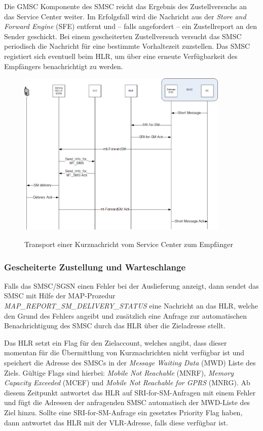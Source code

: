 \documentclass[german,12pt,a4paper]{article}
\begin{document}
Die GMSC Komponente des SMSC reicht das Ergebnis des Zustellversuchs an das Service Center weiter. Im
Erfolgsfall wird die Nachricht aus der \textit{Store and Forward Engine} (SFE) entfernt und -- falls angefordert --
ein Zustellreport an den Sender geschickt\cite{3gpp:techrel}. Bei einem gescheiterten Zustellversuch versucht das SMSC
periodisch die Nachricht für eine bestimmte Vorhaltezeit zuzstellen. Das SMSC registiert sich eventuell 
beim HLR, um über eine erneute Verfügbarkeit des Empfängers benachrichtigt zu werden.

\begin{figure}[htm]
    \centering
	\includegraphics[width=0.9\textwidth]{img/mt-forward-sm.png}
    \label{fig:mt-forward-sm}
    \caption{Transport einer Kurznachricht vom Service Center zum Empfänger}
\end{figure}	

\subsubsection{Gescheiterte Zustellung und Warteschlange}
Falls das SMSC/SGSN einen Fehler bei der Auslieferung anzeigt, dann sendet das SMSC mit Hilfe der 
MAP-Prozedur \textit{MAP\_REPORT\_SM\_DELIVERY\_STATUS} eine Nachricht an das HLR, welche den Grund des Fehlers
angeibt und zusätzlich eine Anfrage zur automatischen Benachrichtigung des SMSC durch das HLR über die 
Zieladresse stellt.

Das HLR setzt ein Flag für den Zielaccount, welches angibt, dass dieser momentan für die Übermittlung von 
Kurznachrichten nicht verfügbar ist und speichert die Adresse des SMSCs in der \textit{Message Waiting Data} (MWD) 
Liste des Ziels. Gültige Flags sind hierbei: \textit{Mobile Not Reachable} (MNRF), \textit{Memory Capacity Exceeded} (MCEF) und
\textit{Mobile Not Reachable for GPRS} (MNRG). Ab diesem Zeitpunkt antwortet das HLR auf SRI-for-SM-Anfragen mit 
einem Fehler und fügt die Adressen der anfragenden SMSC automatisch der MWD-Liste des Ziel hinzu. Sollte 
eine SRI-for-SM-Anfrage ein gesetztes Priority Flag haben, dann antwortet das HLR mit der VLR-Adresse, 
falls diese verfügbar ist.
\end{document}
